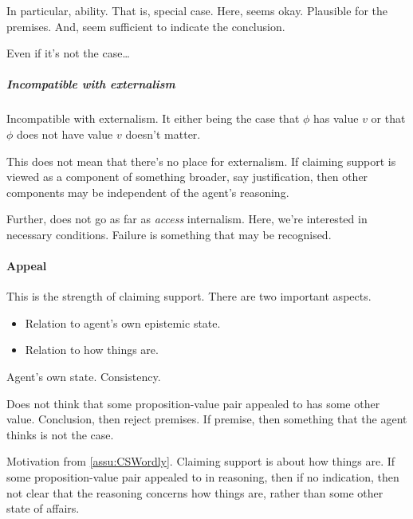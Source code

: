\begin{note}
  In particular, ability.
  That is, special case.
  Here, seems okay.
  Plausible for the premises.
  And, seem sufficient to indicate the conclusion.

  Even if it's not the case\dots
\end{note}


\subparagraph{Incompatible with externalism}

\begin{note}
  Incompatible with externalism.
  It either being the case that \(\phi\) has value \(v\) or that \(\phi\) does not have value \(v\) doesn't matter.

  This does not mean that there's no place for externalism.
  If claiming support is viewed as a component of something broader, say justification, then other components may be independent of the agent's reasoning.

  Further, does not go as far as \emph{access} internalism.
  Here, we're interested in necessary conditions.
  Failure is something that may be recognised.
\end{note}

\paragraph{Appeal}

\begin{note}
  This is the strength of claiming support.
  There are two important aspects.
  \begin{itemize}
  \item Relation to agent's own epistemic state.
  \item Relation to how things are.
  \end{itemize}
\end{note}

\begin{note}
  Agent's own state.
  Consistency.

  Does not think that some proposition-value pair appealed to has some other value.
  Conclusion, then reject premises.
  If premise, then something that the agent thinks is not the case.
\end{note}

\begin{note}
  Motivation from \autoref{assu:CSWordly}.
  Claiming support is about how things are.
  If some proposition-value pair appealed to in reasoning, then if no indication, then not clear that the reasoning concerns how things are, rather than some other \epAdv{} state of affairs.
\end{note}

